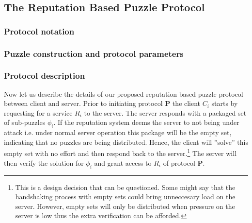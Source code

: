 \subsection{The Reputation Based Puzzle Protocol}
\subsubsection{Protocol notation}
\subsubsection{Puzzle construction and protocol parameters}
\subsubsection{Protocol description}
Now let us describe the details of our proposed reputation based puzzle protocol between client and server. Prior to initiating protocol \textbf{P} the client $C_i$ starts by requesting for a service $R_i$ to the server. The server responds with a packaged set of sub-puzzles $\phi_i$. If the reputation system deems the server to not being under attack i.e. under normal server operation this package will be the empty set, indicating that no puzzles are being distributed. Hence, the client will ''solve'' this empty set with no effort and then respond back to the server.\footnote{This is a design decision that can be questioned. Some might say that the handshaking process with empty sets could bring unneccesary load on the server. However, empty sets will only be distributed when pressure on the server is low thus the extra verification can be afforded.} The server will then verify the solution for $\phi_i$ and grant access to $R_i$ of protocol \textbf{P}.

